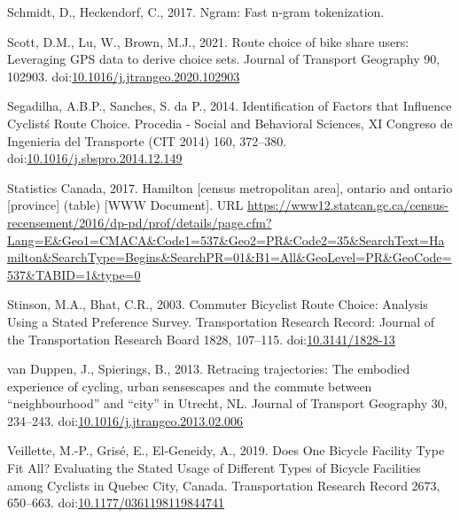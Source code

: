 \documentclass[]{elsarticle} %
\begin{document}
\leavevmode\hypertarget{ref-R-ngram}{}%
Schmidt, D., Heckendorf, C., 2017. Ngram: Fast n-gram tokenization.

\leavevmode\hypertarget{ref-scottRouteChoiceBike2021}{}%
Scott, D.M., Lu, W., Brown, M.J., 2021. Route choice of bike share
users: Leveraging GPS data to derive choice sets. Journal of Transport
Geography 90, 102903.
doi:\href{https://doi.org/10.1016/j.jtrangeo.2020.102903}{10.1016/j.jtrangeo.2020.102903}

\leavevmode\hypertarget{ref-segadilhaIdentificationFactorsThat2014a}{}%
Segadilha, A.B.P., Sanches, S. da P., 2014. Identification of Factors
that Influence Cyclistś Route Choice. Procedia - Social and Behavioral
Sciences, XI Congreso de Ingenieria del Transporte (CIT 2014) 160,
372--380.
doi:\href{https://doi.org/10.1016/j.sbspro.2014.12.149}{10.1016/j.sbspro.2014.12.149}

\leavevmode\hypertarget{ref-Statistics2016}{}%
Statistics Canada, 2017. Hamilton {[}census metropolitan area{]},
ontario and ontario {[}province{]} (table) {[}WWW Document{]}. URL
\url{https://www12.statcan.gc.ca/census-recensement/2016/dp-pd/prof/details/page.cfm?Lang=E\&Geo1=CMACA\&Code1=537\&Geo2=PR\&Code2=35\&SearchText=Hamilton\&SearchType=Begins\&SearchPR=01\&B1=All\&GeoLevel=PR\&GeoCode=537\&TABID=1\&type=0}

\leavevmode\hypertarget{ref-stinsonCommuterBicyclistRoute2003}{}%
Stinson, M.A., Bhat, C.R., 2003. Commuter Bicyclist Route Choice:
Analysis Using a Stated Preference Survey. Transportation Research
Record: Journal of the Transportation Research Board 1828, 107--115.
doi:\href{https://doi.org/10.3141/1828-13}{10.3141/1828-13}

\leavevmode\hypertarget{ref-vanduppenRetracingTrajectoriesEmbodied2013}{}%
van Duppen, J., Spierings, B., 2013. Retracing trajectories: The
embodied experience of cycling, urban sensescapes and the commute
between ``neighbourhood'' and ``city'' in Utrecht, NL. Journal of
Transport Geography 30, 234--243.
doi:\href{https://doi.org/10.1016/j.jtrangeo.2013.02.006}{10.1016/j.jtrangeo.2013.02.006}

\leavevmode\hypertarget{ref-veilletteDoesOneBicycle2019}{}%
Veillette, M.-P., Grisé, E., El-Geneidy, A., 2019. Does One Bicycle
Facility Type Fit All? Evaluating the Stated Usage of Different Types of
Bicycle Facilities among Cyclists in Quebec City, Canada. Transportation
Research Record 2673, 650--663.
doi:\href{https://doi.org/10.1177/0361198119844741}{10.1177/0361198119844741}
\end{document}
